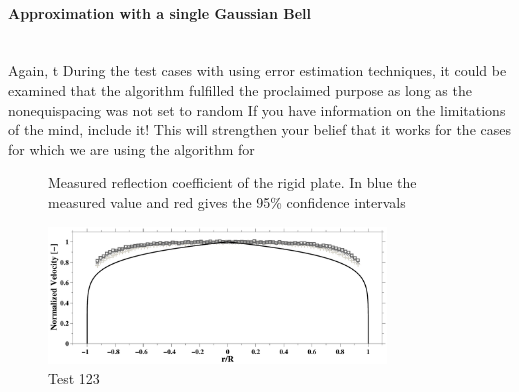 \documentclass[11pt]{report} %
\begin{document}
\paragraph{Approximation with a single Gaussian Bell}  $ $ \\[1ex]

Again, t
During the test cases with using error estimation techniques, it could be examined that the algorithm fulfilled the proclaimed purpose as long as the nonequispacing was not set to random {\color{red} If you have information on the limitations of the mind, include it! This will strengthen your belief that it works for the cases for which we are using the algorithm for}


\begin{figure}[b]%
    \centering
    \caption{Measured reflection coefficient of the rigid plate. In blue the measured value and red gives the 95\% confidence intervals}
    \label{fig:ReflCoeff}
\end{figure} 

\begin{figure}
\centering
\includegraphics[width = 0.8\textwidth]{./Figures/FlowProfile_Large}
\caption{Test 123}
\end{figure}


\cite{Peter2011}
\cite{Mungur1969}
\printbibliography
\end{document}
